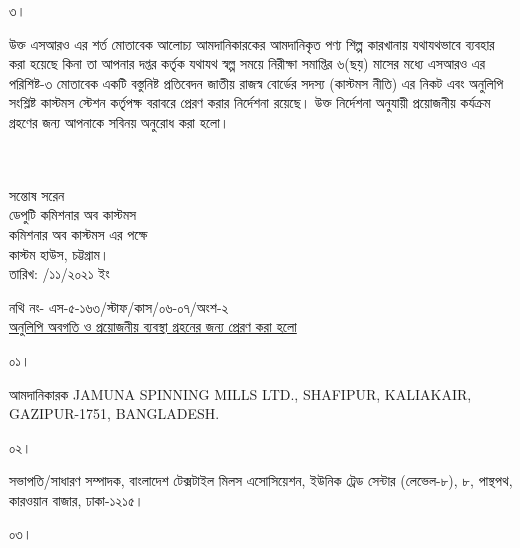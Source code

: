 \documentclass[12pt]{article}
\newcommand{\fileno}{নথি নং- এস-৫-১৬৩/স্টাফ/কাস/০৬-০৭/অংশ-২}
\newcommand{\jsml}{JAMUNA SPINNING MILLS LTD.}
\newcommand{\jsmla}{SHAFIPUR, KALIAKAIR, GAZIPUR-1751, BANGLADESH.}
\newcommand{\rodt}{তারিখ: \hspace{3.5em}/১১/২০২১ ইং}
\begin{document}
\begin{minipage}[t]{.07\linewidth}
৩।
\end{minipage}
\begin{minipage}[t]{.93\linewidth}
উক্ত এসআরও এর শর্ত মোতাবেক
আলোচ্য আমদানিকারকের আমদানিকৃত পণ্য
শিল্প কারখানায় যথাযথভাবে ব্যবহার করা হয়েছে
কিনা তা আপনার দপ্তর কর্তৃক
যথাযথ স্বল্প সময়ে
নিরীক্ষা সমাপ্তির ৬(ছয়) মাসের মধ্যে এসআরও
এর পরিশিষ্ট-৩ মোতাবেক একটি বস্তুনিষ্ট
প্রতিবেদন জাতীয় রাজস্ব বোর্ডের সদস্য
(কাস্টমস নীতি) এর নিকট এবং অনুলিপি সংশ্লিষ্ট
কাস্টমস স্টেশন কর্তৃপক্ষ বরাবরে প্রেরণ করার
নির্দেশনা রয়েছে। উক্ত নির্দেশনা
অনুযায়ী প্রয়োজনীয় কর্যক্রম গ্রহণের জন্য
আপনাকে সবিনয় অনুরোধ করা হলো।
\\
\\
\\
\end{minipage}
\begin{minipage}[t]{0.60\linewidth}
\hspace{1em}
\end{minipage}
\begin{minipage}[t]{0.40\linewidth}
\begin{center}
সন্তোষ সরেন
\\
ডেপুটি কমিশনার অব কাস্টমস
\\
কমিশনার অব কাস্টমস এর পক্ষে
\\
কাস্টম হাউস, চট্টগ্রাম।
\\
\footnotesize{{\rodt}}
\vspace*{10MM}
\end{center}
\end{minipage}
\footnotesize{{\fileno}}
\\
\underline{\footnotesize{অনুলিপি অবগতি ও প্রয়োজনীয় ব্যবস্থা গ্রহনের জন্য প্রেরণ করা হলো}}
\\
\begin{minipage}[t]{0.06\linewidth}
\footnotesize{০১।}
\end{minipage}
\begin{minipage}[t]{0.94\linewidth}
\footnotesize{
আমদানিকারক {\jsml}, {\jsmla}
}
\end{minipage}
\begin{minipage}[t]{0.06\linewidth}
\footnotesize{০২।}
\end{minipage}
\begin{minipage}[t]{0.94\linewidth}
সভাপতি/সাধারণ সম্পাদক, বাংলাদেশ টেক্সটাইল
মিলস এসোসিয়েশন, ইউনিক ট্রেড সেন্টার (লেভেল-৮),
৮, পান্থপথ, কারওয়ান বাজার, ঢাকা-১২১৫।
\end{minipage}
\begin{minipage}[t]{0.06\linewidth}
\footnotesize{০৩।}
\end{minipage}
\end{document}
